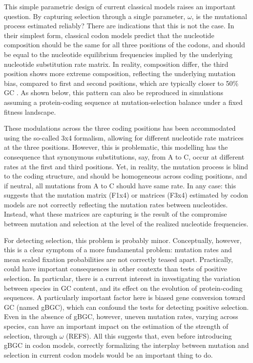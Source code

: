 This simple parametric design of current classical models raises an important question.
By capturing selection through a single parameter, $\omega$, is the mutational process estimated reliably?
There are indications that this is not the case.
In their simplest form, classical codon models predict that the nucleotide composition should be the same for all three positions of the codons, and should be equal to the nucleotide equilibrium frequencies implied by the underlying nucleotide substitution rate matrix.
In reality, composition differ, the third position shows more extreme composition, reflecting the underlying mutation bias, compared to first and second positions, which are typically closer to 50\% GC \citep{Singer2000}.
As shown below, this pattern can also be reproduced in simulations assuming a protein-coding sequence at mutation-selection balance under a fixed fitness landscape.

These modulations across the three coding positions has been accommodated using the so-called 3x4 formalism, allowing for different nucleotide rate matrices at the three positions.
However, this is problematic, this modelling has the consequence that synonymous substitutions, say, from A to C, occur at different rates at the first and third positions.
Yet, in reality, the mutation process is blind to the coding structure, and should be homogeneous across coding positions, and if neutral, all mutations from A to C should have same rate.
In any case: this suggests that the mutation matrix (F1x4) or matrices (F3x4) estimated by codon models are not correctly reflecting the mutation rates between nucleotides.
Instead, what these matrices are capturing is the result of the compromise between mutation and selection at the level of the realized nucleotide frequencies.

For detecting selection, this problem is probably minor.
Conceptually, however, this is a clear symptom of a more fundamental problem: mutation rates and mean scaled fixation probabilities are not correctly teased apart.
Practically, could have important consequences in other contexts than tests of positive selection.
In particular, there is a current interest in investigating the variation between species in GC content, and its effect on the evolution of protein-coding sequences.
A particularly important factor here is biased gene conversion toward GC (named gBGC), which can confound the tests for detecting positive selection.
Even in the absence of gBGC, however, uneven mutation rates, varying across species, can have an important impact on the estimation of the strength of selection, through $\omega$ (REFS).
All this suggests that, even before introducing gBGC in codon models, correctly formalizing the interplay between mutation and selection in current codon models would be an important thing to do.

